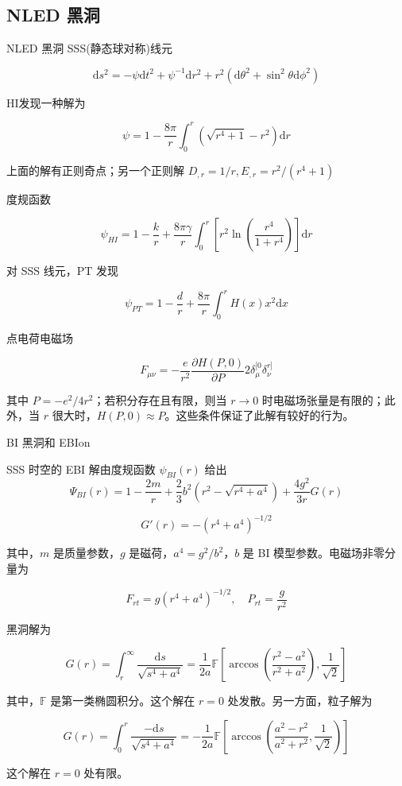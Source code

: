 \documentclass[9pt, dvipsnames]{beamer} %
\begin{document}
\subsection{NLED 黑洞}

\begin{frame}{NLED 黑洞}
    SSS(静态球对称)线元

    $$
    \mathrm{d}s^2 = -\psi\mathrm{d}t^2 + \psi^{-1} \mathrm{d}r^2 + r^2\left(\mathrm{d}\theta^2+\sin^2\theta\mathrm{d}\phi^2 \right)
    $$
    
    HI发现一种解为
    
    $$
    \psi
    =1-\frac{8\pi }{r } \int_{0}^{r} \left(\sqrt{r^4+1} - r^2 \right)\mathrm{d}r
    $$
    
    上面的解有正则奇点；另一个正则解 $D_{,r}=1/r,E_{,r}=r^2/\left(r^4+1 \right) $
    
    度规函数
    
    $$
    \psi_{HI}
    =1-\frac{k }{r } + \frac{8\pi\gamma }{r } \int_{0}^{r} \left[r^2\ln\left(\frac{r^4 }{1+r^4 }  \right) \right] \mathrm{d}r
    $$

    
\end{frame}

\begin{frame}
    对 SSS 线元，PT 发现

    $$
    \psi_{PT}
    =1-\frac{d }{r } + \frac{8\pi }{r } \int_{0}^{r} H(x) x^2\mathrm{d}x
    $$

    点电荷电磁场

$$
F_{\mu\nu}
=-\frac{e }{r^2 } \frac{\partial H(P,0) }{\partial P } 2\delta_\mu^{[0}\delta_{\nu}^{r]}
$$

其中 $P=-e^2/4r^2$；若积分存在且有限，则当 $r\to 0$ 时电磁场张量是有限的；此外，当 $r$ 很大时，$H(P,0)\approx P$。这些条件保证了此解有较好的行为。

\end{frame}

\begin{frame}{BI 黑洞和 EBIon}

    SSS 时空的 EBI 解由度规函数 $\psi_{BI}(r)$ 给出
$$
\Psi_{BI}(r)
=1-\frac{2m }{r } + \frac{2 }{3 } b^2\left(r^2-\sqrt{r^4+a^4} \right) + \frac{4g^2 }{3r } G(r)
$$

$$
G'(r)
=-\left(r^4+a^4 \right)^{-1/2}
$$

其中，$m$ 是质量参数，$g$ 是磁荷，$a^4=g^2/b^2$，$b$ 是 BI 模型参数。电磁场非零分量为

$$
F_{rt}
=g\left(r^4+a^4 \right)^{-1/2},\quad
P_{rt}
=\frac{g }{r^2 }
$$

黑洞解为

$$
G(r)
=\int_{r}^{\infty} \frac{\mathrm{d}s }{\sqrt{s^4+a^4} } 
=\frac{1 }{2a } \mathbb{F} \left[\arccos\left(\frac{r^2-a^2 }{r^2+a^2 }  \right) , \frac{1 }{\sqrt{2} }  \right]
$$

其中，$\mathbb{F}$ 是第一类椭圆积分。这个解在 $r=0$ 处发散。另一方面，粒子解为

$$
G(r)
=\int_{0}^{r} \frac{-\mathrm{d}s }{\sqrt{s^4+a^4} } 
=-\frac{1 }{2a } \mathbb{F}\left[\arccos\left(\frac{a^2-r^2 }{a^2+r^2 } , \frac{1 }{\sqrt{2} }  \right) \right]
$$

这个解在 $r=0$ 处有限。

\end{frame}
\end{document}
